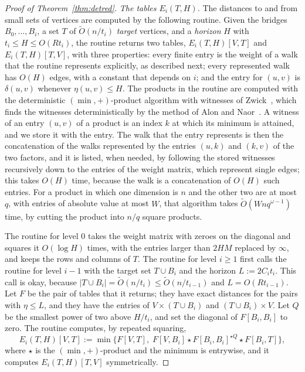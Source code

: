 \begin{proof}[Proof of Theorem~\ref{thm:detred}]
\emph{The tables $E_i(T,H)$.} The distances to and from small sets of vertices are computed by the following routine. Given the bridges $B_0,\dots,B_i$, a set $T$ of $\tilde O(n/t_i)$ \emph{target} vertices, and a \emph{horizon} $H$ with $t_i\le H\le O(Rt_i)$, the routine returns two tables, $E_i(T,H)[V,T]$ and $E_i(T,H)[T,V]$, with three properties: every finite entry is the weight of a walk that the routine represents explicitly, as described next; every represented walk has $O(H)$ edges, with a constant that depends on $i$; and the entry for $(u,v)$ is $\delta(u,v)$ whenever $\eta(u,v)\le H$. The products in the routine are computed with the deterministic $(\min,+)$-product algorithm with witnesses of Zwick~\cite[Lemma~3.3]{Zwi02}, which finds the witnesses deterministically by the method of Alon and Naor~\cite{AN96}. A witness of an entry $(u,v)$ of a product is an index $k$ at which its minimum is attained, and we store it with the entry. The walk that the entry represents is then the concatenation of the walks represented by the entries $(u,k)$ and $(k,v)$ of the two factors, and it is listed, when needed, by following the stored witnesses recursively down to the entries of the weight matrix, which represent single edges; this takes $O(H)$ time, because the walk is a concatenation of $O(H)$ such entries. For a product in which one dimension is $n$ and the other two are at most $q$, with entries of absolute value at most $W$, that algorithm takes $\tilde O(Wnq^{\omega-1})$ time, by cutting the product into $n/q$ square products.

The routine for level $0$ takes the weight matrix with zeroes on the diagonal and squares it $O(\log H)$ times, with the entries larger than $2HM$ replaced by $\infty$, and keeps the rows and columns of $T$. The routine for level $i\ge1$ first calls the routine for level $i-1$ with the target set $T\cup B_i$ and the horizon $L:=2C_it_i$. This call is okay, because $|T\cup B_i|=\tilde O(n/t_i)\le\tilde O(n/t_{i-1})$ and $L=O(Rt_{i-1})$. Let $F$ be the pair of tables that it returns; they have exact distances for the pairs with $\eta\le L$, and they have the entries of $V\times(T\cup B_i)$ and $(T\cup B_i)\times V$. Let $Q$ be the smallest power of two above $H/t_i$, and set the diagonal of $F[B_i,B_i]$ to zero. The routine computes, by repeated squaring,
\[
E_i(T,H)[V,T]:=\min\bigl\{F[V,T],\;F[V,B_i]\star F[B_i,B_i]^{\star Q}\star F[B_i,T]\bigr\},
\]
where $\star$ is the $(\min,+)$-product and the minimum is entrywise, and it computes $E_i(T,H)[T,V]$ symmetrically.


\end{proof}

